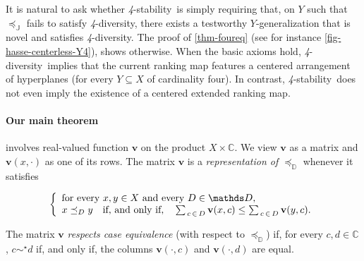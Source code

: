 \documentclass[12pt,a4paper,twoside]{article}
\newcommand{\mbbd}{{\mathds D}}
\newcommand{\mbbc}{{\mathds C}}
\newcommand{\mbbj}{\mathds J}
\newcommand{\stability}{\textit{4}-\textup{{stability}}}
\newcommand{\fourdiv}{\textit{4}-\textup{diversity}}
\begin{document}
It is natural to ask whether \stability\ is simply requiring that, on $Y$ such
that $\preceq_{\mbbj}$ fails to satisfy \fourdiv, there exists a testworthy
$Y$-{generalization} that is novel and satisfies \fourdiv. The proof of
\cref{thm-foureq} (see for instance \cref{fig-hasse-centerless-Y4}), shows
otherwise. When the basic axioms hold, \fourdiv\ implies that the current
ranking map features a centered arrangement of hyperplanes (for every
$Y\subseteq X$ of cardinality four). In contrast, \stability\ does not even
imply the existence of a centered extended ranking map.

\paragraph{Our main theorem\hskip-5pt} involves real-valued
function $\mathbf{v}$ on the product $X \times \mbbc$. We view $\mathbf{v}$ as
a matrix and $\mathbf{v}(x, \cdot)$ as one of its rows.  The matrix
$\mathbf{v}$ is a \emph{representation of $\preceq_{\mbbd}$} whenever it
satisfies \label{sec-main}
 \begin{linenomath*} 
\begin{equation}\notag\label{eq-rep-main}
  \left\{
  \begin{array}{l}
    \text{for every $x , y \in X$ and every $D \in \mbbd$,}\\
    x \preceq_{D} y \quad \text{if, and only if,} \quad \sum _ {\, c \,\in\, D}
    \mathbf{v}(x, c) \leq \sum_{\, c \,\in\, D} \mathbf{v}(y, c) .
  \end{array}\right.
\end{equation}
\end{linenomath*}
The matrix $\mathbf{v}$ \emph{respects case equivalence} (with respect to
$\preceq_{\mbbd}$) if, for every $c,d\in \mbbc$, $c \sim^{\star} d$ if, and
only if, the columns $\mathbf{v}(\cdot, c)$ and $\mathbf{v}(\cdot, d)$ are equal.
\end{document}
